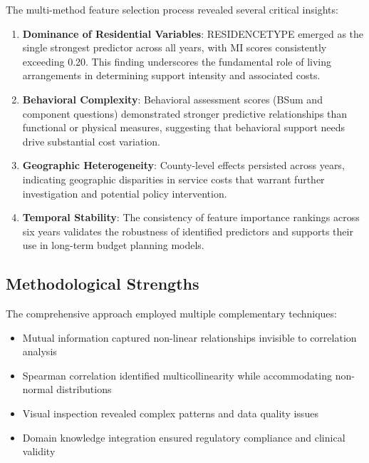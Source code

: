 The multi-method feature selection process revealed several critical insights:

\begin{enumerate}
    \item \textbf{Dominance of Residential Variables}: RESIDENCETYPE emerged as the single strongest predictor across all years, with MI scores consistently exceeding 0.20. This finding underscores the fundamental role of living arrangements in determining support intensity and associated costs.
    
    \item \textbf{Behavioral Complexity}: Behavioral assessment scores (BSum and component questions) demonstrated stronger predictive relationships than functional or physical measures, suggesting that behavioral support needs drive substantial cost variation.
    
    \item \textbf{Geographic Heterogeneity}: County-level effects persisted across years, indicating geographic disparities in service costs that warrant further investigation and potential policy intervention.
    
    \item \textbf{Temporal Stability}: The consistency of feature importance rankings across six years validates the robustness of identified predictors and supports their use in long-term budget planning models.
\end{enumerate}

\subsection{Methodological Strengths}
\label{subsec:methodological-strengths}

The comprehensive approach employed multiple complementary techniques:

\begin{itemize}
    \item Mutual information captured non-linear relationships invisible to correlation analysis
    \item Spearman correlation identified multicollinearity while accommodating non-normal distributions
    \item Visual inspection revealed complex patterns and data quality issues
    \item Domain knowledge integration ensured regulatory compliance and clinical validity
\end{itemize}

